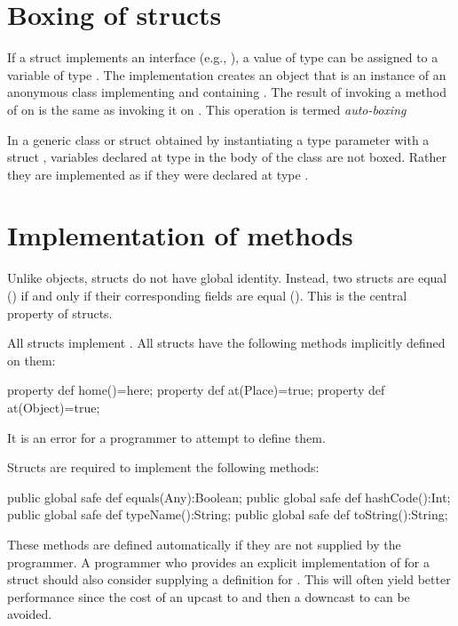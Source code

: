 \section{Boxing of structs}
If a struct  implements an interface  (e.g., ),
a value  of type  can be assigned to a variable of type
. The implementation creates an object  that is an
instance of an anonymous class implementing  and containing
.  The result of invoking a method of  on  is the
same as invoking it on . This operation is termed {\em auto-boxing}
\label{auto-boxing}

In a generic class or struct obtained by instantiating a type parameter
 with a struct , variables declared at type  in the body
of the class are not boxed. Rather they are implemented as if they were declared at
type . 

\section{Implementation of  methods}
\label{StructAnyMethods}

Unlike objects, structs do not have global identity. Instead, two
structs are equal (\Xcd{==}) if and only if their corresponding fields
are equal (\Xcd{==}). This is the central property of structs.

All structs implement . All 
structs have the following methods implicitly defined on them:
\begin{xten}
  property def home()=here;
  property def at(Place)=true;
  property def at(Object)=true;
\end{xten}
\noindent It is an error for a programmer to attempt to define them.

Structs are required to implement the following methods: 
\begin{xten}
  public global safe def equals(Any):Boolean;
  public global safe def hashCode():Int;
  public global safe def typeName():String;
  public global safe def toString():String;  
\end{xten}

These methods are defined automatically if they are not supplied by
the programmer.  A programmer who provides an explicit implementation
of  for a struct  should also consider
supplying a definition for . This will often
yield better performance since the cost of an upcast to  and
then a downcast to  can be avoided.

